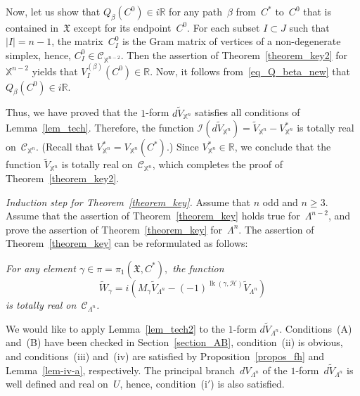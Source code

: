 \documentclass[reqno,tbtags,12pt]{amsart}
\numberwithin{equation}{section}
\newcommand{\R}{\mathbb{R}}
\newcommand{\CH}{\mathcal{H}}
\newcommand{\CC}{\mathcal{C}}
\newcommand{\X}{\mathbb{X}}
\newcommand{\FX}{\mathfrak{X}}
\newcommand{\CI}{\mathcal{I}}
\newcommand{\tV}{\widetilde{V}}
\newcommand{\tW}{\widetilde{W}}
\newcommand{\lk}{\mathop{\mathrm{lk}}\nolimits}
\theoremstyle{definition}
\begin{document}
Now, let us show that $Q_{\beta}(C^0)\in i\R$ for any path~$\beta$ from~$C^*$ to~$C^0$ that is contained in~$\FX$ except for its endpoint~$C^0$. For each subset $I\subset J$ such that $|I|=n-1$, the matrix~$C^0_I$ is the Gram matrix of vertices of a non-degenerate simplex, hence,  $C_I^0\in \CC_{\X^{n-2}}$. Then the assertion of Theorem~\ref{theorem_key2} for~$\X^{n-2}$ yields that  $V^{(\beta)}_I(C^0)\in\R$. Now, it follows from~\eqref{eq_Q_beta_new} that $Q_{\beta}(C^0)\in i\R$. 

Thus, we have proved that the $1$-form $d\tV_{\X^n}$ satisfies all conditions of Lemma~\ref{lem_tech}. Therefore, the function $\CI(d\tV_{\X^n})=\tV_{\X^n}-V_{\X^n}^*$ is totally real on~$\CC_{\X^n}$. (Recall that $V_{\X^n}^*=V_{\X^n}(C^*)$.) Since $V_{\X^n}^*\in\R$, we conclude that the function $\tV_{\X^n}$ is totally real on~$\CC_{\X^n}$, which completes the proof of Theorem~\ref{theorem_key2}.

\textsl{Induction step for Theorem~\ref{theorem_key}.}  
Assume that $n$ odd and $n\ge 3$. Assume that the assertion of Theorem~\ref{theorem_key} holds true for~$\Lambda^{n-2}$, and prove the assertion of Theorem~\ref{theorem_key} for~$\Lambda^n$. 
The assertion of Theorem~\ref{theorem_key} can be reformulated as follows:

\textit{For any element $\gamma\in\pi=\pi_1(\FX,C^*),$ the function 
\begin{equation}\label{eq_tW_gamma}
\tW_{\gamma}=i\left(M_{\gamma}\tV_{\Lambda^n}-(-1)^{\lk(\gamma,\CH)}\tV_{\Lambda^n}\right)
\end{equation}
is totally real on~$\CC_{\Lambda^n}$.}



We would like to apply Lemma~\ref{lem_tech2} to the $1$-form $d\tV_{\Lambda^n}$. Conditions~(A) and~(B) have been checked in Section~\ref{section_AB}, condition~(ii) is obvious, and conditions~(iii) and~(iv) are satisfied by Proposition~\ref{propos_fh} and Lemma~\ref{lem-iv-a}, respectively. The principal branch~$dV_{\Lambda^n}$ of the $1$-form~$d\tV_{\Lambda^n}$ is well defined and real on~$U$, hence, condition~(i${}'$) is also satisfied.

 
\end{document}
